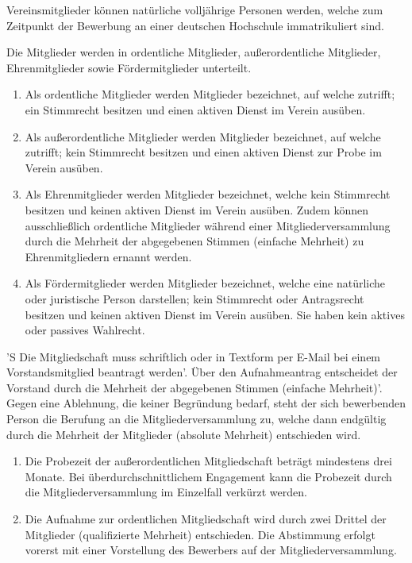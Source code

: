 \documentclass[%
    parskip=half,
]{scrartcl}
\begin{document}
\begin{contract}


Vereinsmitglieder können natürliche volljährige Personen werden, welche zum Zeitpunkt der Bewerbung an einer deutschen Hochschule immatrikuliert sind.\label{p:mitgliedschaft}

Die Mitglieder werden in ordentliche Mitglieder, außerordentliche Mitglieder, Ehrenmitglieder sowie Fördermitglieder unterteilt.

\begin{enumerate}[\qquad a)]
    \item Als ordentliche Mitglieder werden Mitglieder bezeichnet, auf welche  zutrifft; ein Stimmrecht besitzen und einen aktiven Dienst im Verein ausüben.
	\item Als außerordentliche Mitglieder werden Mitglieder bezeichnet, auf welche  zutrifft; kein Stimmrecht besitzen und einen aktiven Dienst zur Probe im Verein ausüben.
	\item Als Ehrenmitglieder werden Mitglieder bezeichnet, welche kein Stimmrecht besitzen und keinen aktiven Dienst im Verein ausüben. Zudem können ausschließlich ordentliche Mitglieder während einer Mitgliederversammlung durch die Mehrheit der abgegebenen Stimmen (einfache Mehrheit) zu Ehrenmitgliedern ernannt werden.
	\item Als Fördermitglieder werden Mitglieder bezeichnet, welche eine natürliche oder juristische Person darstellen; kein Stimmrecht oder Antragsrecht besitzen und keinen aktiven Dienst im Verein ausüben. Sie haben kein aktives oder passives Wahlrecht.
\end{enumerate}

'S Die Mitgliedschaft muss schriftlich oder in Textform per E-Mail bei einem Vorstandsmitglied beantragt werden'.
Über den Aufnahmeantrag entscheidet der Vorstand durch die Mehrheit der abgegebenen Stimmen (einfache Mehrheit)'.
Gegen eine Ablehnung, die keiner Begründung bedarf, steht der sich bewerbenden Person die Berufung an die Mitgliederversammlung zu, welche dann endgültig durch die Mehrheit der Mitglieder (absolute Mehrheit) entschieden wird.

\begin{enumerate}[\qquad a)]
    \item Die Probezeit der außerordentlichen Mitgliedschaft beträgt mindestens drei Monate. Bei überdurchschnittlichem Engagement kann die Probezeit durch die Mitgliederversammlung im Einzelfall verkürzt werden.
	\item Die Aufnahme zur ordentlichen Mitgliedschaft wird durch zwei Drittel der Mitglieder (qualifizierte Mehrheit) entschieden. Die Abstimmung erfolgt vorerst mit einer Vorstellung des Bewerbers auf der Mitgliederversammlung.
\end{enumerate}


\end{contract}
\end{document}

